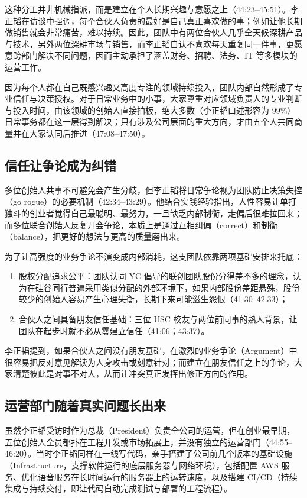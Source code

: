 \documentclass[UTF8,a4paper,11pt,fontset=fandol]{ctexart}
\begin{document}
这种分工并非机械指派，而是建立在个人长期兴趣与意愿之上（44:23–45:51）。李正韬在访谈中强调，每个合伙人负责的最好是自己真正喜欢做的事；例如让他长期做销售就会非常痛苦，难以持续。因此，团队中有两位合伙人几乎全天候深耕产品与技术，另外两位深耕市场与销售，而李正韬自认不喜欢每天重复同一件事，更愿意跨部门解决不同问题，因而主动承担了涵盖财务、招聘、法务、IT 等多模块的运营工作。

因为每个人都在自己既感兴趣又高度专注的领域持续投入，团队内部自然形成了专业信任与决策授权。对于日常业务中的小事，大家尊重对应领域负责人的专业判断与投入时间，由该领域的创始人直接拍板，绝大多数（李正韬口述形容为 99\%）日常事务都在这一层得到解决；只有涉及公司层面的重大方向，才由五个人共同商量并在大家认同后推进（47:08–47:50）。

\subsection{信任让争论成为纠错}
多位创始人共事不可避免会产生分歧，但李正韬将日常争论视为团队防止决策失控（go rogue）的必要机制（42:34–43:29）。他结合实践经验指出，人性容易让单打独斗的创业者觉得自己最聪明、最努力，一旦缺乏内部制衡，走偏后很难拉回来；而多位联合创始人反复开会争论，本质上是通过互相纠偏（correct）和制衡（balance），把更好的想法与更高的质量磨出来。

为了让高强度的业务争论不演变成内部消耗，这支团队依靠两项基础安排来托底：
\begin{enumerate}
\item 股权分配追求公平：团队认同 YC 倡导的联创团队股份分得差不多的理念，认为在硅谷同行普遍采用类似分配的外部环境下，如果内部股份差距悬殊，股份较少的创始人容易产生心理失衡，长期下来可能滋生怨恨（41:30–42:33）；
\item 合伙人之间具备朋友信任基础：三位 USC 校友与两位前同事的熟人背景，让团队在起步时就不必从零建立信任（41:06；43:37）。
\end{enumerate}

李正韬提到，如果合伙人之间没有朋友基础，在激烈的业务争论（Argument）中很容易把反对意见解读为人身攻击或刻意针对；而建立在朋友信任之上的争论，大家清楚彼此是对事不对人，从而让冲突真正发挥出修正方向的作用。

\subsection{运营部门随着真实问题长出来}
虽然李正韬受访时作为总裁（President）负责全公司的运营，但在创业最早期，五位创始人全员都扑在工程开发或市场拓展上，并没有独立的运营部门（44:55–46:20）。当时李正韬同样在一线写代码，亲手搭建了公司前几个版本的基础设施（Infrastructure，支撑软件运行的底层服务器与网络环境），包括配置 AWS 服务、优化语音服务在长时间运行的服务器上的运转速度，以及搭建 CI/CD（持续集成与持续交付，即让代码自动完成测试与部署的工程流程）。
\end{document}
